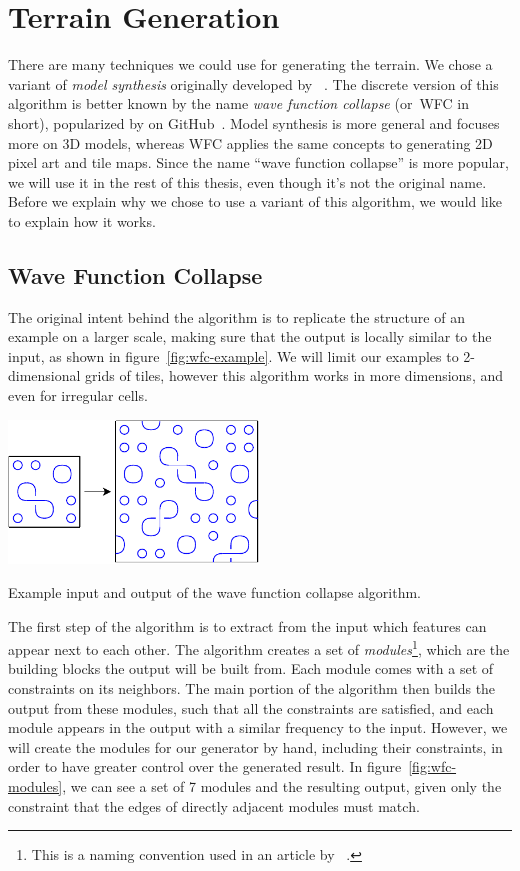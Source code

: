 \section{Terrain Generation}

There are many techniques we could use for generating the terrain.
We chose a variant of \emph{model synthesis} originally developed by ~\cite{ModelSynthesis}.
The discrete version of this algorithm is better known by the name \emph{wave function collapse} (or~WFC in short), popularized by  on GitHub~\cite{WFC}.
Model synthesis is more general and focuses more on 3D models, whereas WFC applies the same concepts to generating 2D pixel art and tile maps.
Since the name \enquote{wave function collapse} is more popular, we will use it in the rest of this thesis, even though it's not the original name.
Before we explain why we chose to use a variant of this algorithm, we would like to explain how it works.

\subsection{Wave Function Collapse}

The original intent behind the algorithm is to replicate the structure of an example on a larger scale, making sure that the output is locally similar to the input, as shown in figure~\ref{fig:wfc-example}.
We will limit our examples to 2-dimensional grids of tiles, however this algorithm works in more dimensions, and even for irregular cells.

\begin{center}
    \captionsetup{type=figure}
    \includegraphics[width=0.5\textwidth]{img/WFC Example.pdf}
    \caption{Example input and output of the wave function collapse algorithm.}
    \label{fig:wfc-example}
\end{center}

The first step of the algorithm is to extract from the input which features can appear next to each other.
The algorithm creates a set of \emph{modules}\footnote{This is a naming convention used in an article by ~\cite{WFCMarian}.}, which are the building blocks the output will be built from.
Each module comes with a set of constraints on its neighbors.
The main portion of the algorithm then builds the output from these modules, such that all the constraints are satisfied, and each module appears in the output with a similar frequency to the input.
However, we will create the modules for our generator by hand, including their constraints, in order to have greater control over the generated result.
In figure~\ref{fig:wfc-modules}, we can see a set of 7 modules and the resulting output, given only the constraint that the edges of directly adjacent modules must match.

